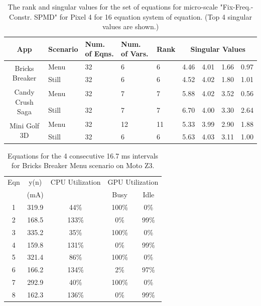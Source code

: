 \begin{table}[tp]
{\footnotesize
    \centering
    \caption{The rank and singular values for the set of equations for micro-scale "Fix-Freq.-Constr. SPMD" for Pixel 4 for 16 equation system of equation.
    (Top 4 singular values are shown.)
    }
    \vspace{-0.1in}
    \begin{tabular}{|c|p{9mm}|p{4.5mm}|p{4.5mm}|p{4.5mm}|p{4mm}|p{4mm}|p{4mm}|p{4mm}|}
    \hline
        App & Scenario & Num. of Eqns. & Num. of Vars. & Rank &  \multicolumn{4}{c|}{Singular Values} \\
        \hline
         \multirow{2}{13mm}{Bricks Breaker} & Menu & 32 & 6 & 6 & 4.46  & 4.01  & 1.66  & 0.97 \\
         \cline{2-9}
         & Still &  32 & 6 & 6 & 4.52  & 4.02  & 1.80  & 1.01 \\
         \hline
         \multirow{2}{13mm}{Candy Crush Saga} & Menu & 32 & 7 & 7 & 5.88  & 4.02  & 3.52  & 0.56 \\
         \cline{2-9}
         & Still & 32 & 7 & 7 & 6.70  & 4.00  & 3.30  & 2.64 \\
         \hline
        \multirow{2}{13mm}{Mini Golf 3D} & Menu & 32 & 12 & 11 & 5.33  & 3.99  & 2.90  & 1.88 \\
        \cline{2-9}
	     & Still & 32 & 6 & 6 & 5.63  & 4.03  & 3.11  & 1.00 \\
	     \hline
    \end{tabular}
    \label{tab:micro-rank_motoz3}
    \vspace{-0.1in}
}
\end{table}



\begin{table}[tp]
    \centering
    \caption{Equations for the 4 consecutive 16.7 ms intervals for Bricks Breaker Menu scenario on Moto Z3.}
    {\small
    \begin{tabular}{|c|c|c|c|c|}
        \hline
             Eqn &    y(n) & \multicolumn{1}{c|}{CPU Utilization} & \multicolumn{2}{c|}{GPU Utilization} \\
        \cline{4-5}
             & (mA) & \multicolumn{1}{c|}{} & Busy & Idle \\
        \hline
                1 & 319.9 &  44\% & 100\% &   0\% \\  
                2 & 168.5 & 133\% &   0\% &  99\% \\
                \hline
                3 & 335.2 &  35\% & 100\% &   0\% \\ 
                4 & 159.8 & 131\% &   0\% &  99\% \\
                \hline
                5 & 321.4 &  86\% & 100\% &   0\% \\ 
                6 & 166.2 & 134\% &   2\% &  97\% \\
                \hline
                7 & 292.9 &  40\% & 100\% &   0\% \\ 
                8 & 162.3 & 136\% &   0\% &  99\% \\   
        \hline
    \end{tabular}
    }
    \label{tab:equations_micro}
\end{table}

